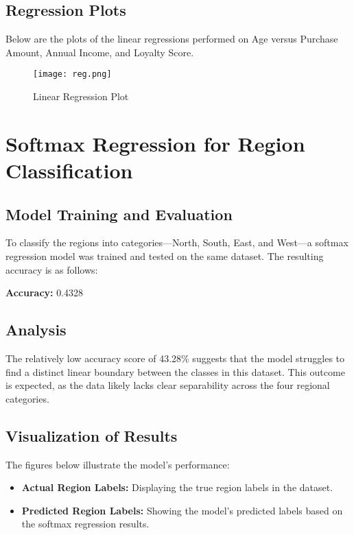 \documentclass[11pt]{article}
\begin{document}
\subsection{Regression Plots}

Below are the plots of the linear regressions performed on Age versus Purchase Amount, Annual Income, and Loyalty Score.

\begin{figure}[H]
\centering
\texttt{[image: reg.png]}
\caption{Linear Regression Plot}
\label{fig:reg}
\end{figure}

\section{Softmax Regression for Region Classification}

\subsection{Model Training and Evaluation}
To classify the regions into categories—North, South, East, and West—a softmax regression model was trained and tested on the same dataset. The resulting accuracy is as follows:

\begin{center}
\textbf{Accuracy:} 0.4328
\end{center}

\subsection{Analysis}
The relatively low accuracy score of 43.28\% suggests that the model struggles to find a distinct linear boundary between the classes in this dataset. This outcome is expected, as the data likely lacks clear separability across the four regional categories.

\subsection{Visualization of Results}
The figures below illustrate the model’s performance:
\begin{itemize}
    \item \textbf{Actual Region Labels:} Displaying the true region labels in the dataset.
    \item \textbf{Predicted Region Labels:} Showing the model's predicted labels based on the softmax regression results.
\end{itemize}
\end{document}
